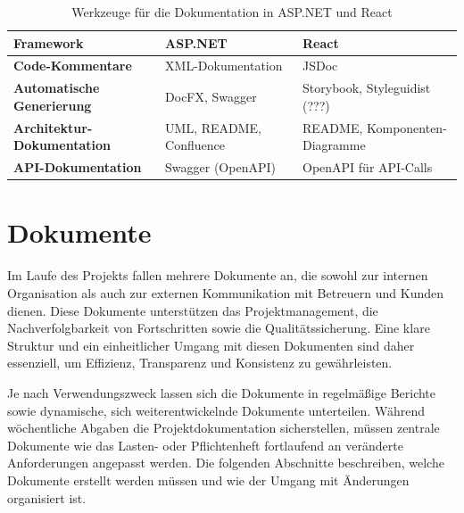 \documentclass[a4paper,12pt]{article}
\begin{document}
\begin{table}[h]
    \centering
    \begin{tabular}{|p{4.5cm}|p{4.5cm}|p{4.5cm}|}
        \hline
        \textbf{Framework}                 & \textbf{ASP.NET}        & \textbf{React}                \\ \hline
        \textbf{Code-Kommentare}           & XML-Dokumentation       & JSDoc                         \\ \hline
        \textbf{Automatische Generierung}  & DocFX, Swagger          & Storybook, Styleguidist (???) \\ \hline
        \textbf{Architektur-Dokumentation} & UML, README, Confluence & README, Komponenten-Diagramme \\ \hline
        \textbf{API-Dokumentation}         & Swagger (OpenAPI)       & OpenAPI für API-Calls         \\ \hline
    \end{tabular}
    \caption{Werkzeuge für die Dokumentation in ASP.NET und React}
    \label{tab:werkzeuge_dokumentation}
\end{table}

\section{Dokumente}
Im Laufe des Projekts fallen mehrere Dokumente an, die sowohl zur internen Organisation als auch zur externen Kommunikation mit Betreuern und Kunden dienen. Diese Dokumente unterstützen das Projektmanagement, die Nachverfolgbarkeit von Fortschritten sowie die Qualitätssicherung. Eine klare Struktur und ein einheitlicher Umgang mit diesen Dokumenten sind daher essenziell, um Effizienz, Transparenz und Konsistenz zu gewährleisten.

Je nach Verwendungszweck lassen sich die Dokumente in regelmäßige Berichte sowie dynamische, sich weiterentwickelnde Dokumente unterteilen. Während wöchentliche Abgaben die Projektdokumentation sicherstellen, müssen zentrale Dokumente wie das Lasten- oder Pflichtenheft fortlaufend an veränderte Anforderungen angepasst werden. Die folgenden Abschnitte beschreiben, welche Dokumente erstellt werden müssen und wie der Umgang mit Änderungen organisiert ist.
\end{document}
